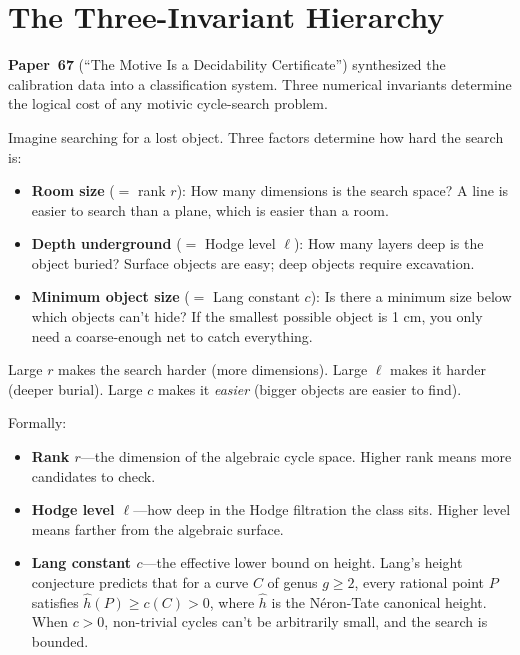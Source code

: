 \documentclass[11pt,twoside,openany]{report}
\theoremstyle{remark}
\newcommand{\paperref}[1]{\textbf{Paper~#1}}
\begin{document}
\section{The Three-Invariant Hierarchy}

\paperref{67} (``The Motive Is a Decidability Certificate'') synthesized the calibration data into a classification system. Three numerical invariants determine the logical cost of any motivic cycle-search problem.

\begin{analogybox}
Imagine searching for a lost object. Three factors determine how hard the search is:
\begin{itemize}
  \item \textbf{Room size} ($=$ rank $r$): How many dimensions is the search space? A line is easier to search than a plane, which is easier than a room.
  \item \textbf{Depth underground} ($=$ Hodge level $\ell$): How many layers deep is the object buried? Surface objects are easy; deep objects require excavation.
  \item \textbf{Minimum object size} ($=$ Lang constant $c$): Is there a minimum size below which objects can't hide? If the smallest possible object is 1 cm, you only need a coarse-enough net to catch everything.
\end{itemize}
Large $r$ makes the search harder (more dimensions). Large $\ell$ makes it harder (deeper burial). Large $c$ makes it \emph{easier} (bigger objects are easier to find).
\end{analogybox}

Formally:
\begin{itemize}
  \item \textbf{Rank $r$}---the dimension of the algebraic cycle space. Higher rank means more candidates to check.
  \item \textbf{Hodge level $\ell$}---how deep in the Hodge filtration the class sits. Higher level means farther from the algebraic surface.
  \item \textbf{Lang constant $c$}---the effective lower bound on height. Lang's height conjecture predicts that for a curve $C$ of genus $g \geq 2$, every rational point $P$ satisfies $\hat{h}(P) \geq c(C) > 0$, where $\hat{h}$ is the N\'eron-Tate canonical height. When $c > 0$, non-trivial cycles can't be arbitrarily small, and the search is bounded.
\end{itemize}
\end{document}
